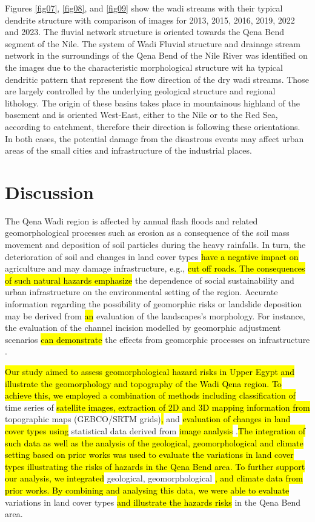 \documentclass[information,article,submit,pdftex,moreauthors]{Definitions/mdpi}
\begin{document}
Figures \ref{fig07}, \ref{fig08}, and \ref{fig09} show the wadi streams with their typical dendrite structure with comparison of images for 2013, 2015, 2016, 2019, 2022 and 2023. The fluvial network structure is oriented towards the Qena Bend segment of the Nile. The system of Wadi Fluvial structure and drainage stream network in the surroundings of the Qena Bend of the Nile River was identified on the images due to the characteristic morphological structure wit ha typical dendritic pattern that represent the flow direction of the dry wadi streams. Those are largely controlled by the underlying geological structure and regional lithology. The origin of these basins takes place in mountainous highland of the basement and is oriented West-East, either to the Nile or to the Red Sea, according to catchment, therefore their direction is following these orientations. In both cases, the potential damage from the disastrous events may affect urban areas of the small cities and infrastructure of the industrial places. 

\section{Discussion}

The Qena Wadi region is affected by annual flash floods and related geomorphological processes such as erosion as a consequence of the soil mass movement and deposition of soil particles during the heavy rainfalls. In turn, the deterioration of soil and changes in land cover types \hl{have a negative impact on }agriculture and may damage infrastructure, e.g., \hl{cut off roads. The consequences of such natural hazards emphasize }the dependence of social sustainability and urban infrastructure on the environmental setting of the region. Accurate information regarding the possibility of geomorphic risks or landslide deposition may be derived from \hl{an }evaluation of the landscapes's morphology. For instance, the evaluation of the channel incision modelled by geomorphic adjustment scenarios \hl{can demonstrate } the effects from geomorphic processes on infrastructure \cite{Hermas}.

\hl{Our study aimed to assess geomorphological hazard risks in Upper Egypt and illustrate the geomorphology and topography of the Wadi Qena region. To achieve this, we employed a combination of methods including classification of }time series of \hl{satellite images, extraction of 2D and 3D mapping information from } topographic maps (GEBCO/SRTM grids)\hl{, }and \hl{evaluation of changes in land cover types using }statistical data derived from \hl{image analysis} .\hl{The integration of such data as well as the analysis of the geological, geomorphological and climate setting based on prior works was used to evaluate the variations in land cover types illustrating the risks of hazards in the Qena Bend area. To further support our analysis, we integrated } geological, geomorphological \hl{, and climate data from prior works. By combining and analysing this data, we were able to evaluate } variations in land cover types \hl{and illustrate the hazards risks } in the Qena Bend area.
\end{document}
